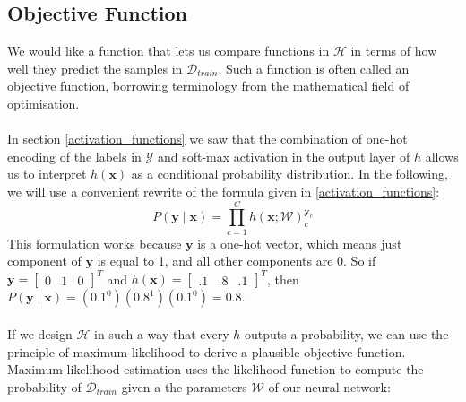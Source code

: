 \subsection{Objective Function}
We would like a function that lets us compare functions in $\mathcal{H}$ in terms of how well they predict the samples in $\mathcal{D}_{train}$. Such a function is often called an objective function, borrowing terminology from the mathematical field of optimisation.
\\\\
In section \ref{activation_functions} we saw that the combination of one-hot encoding of the labels in $\mathcal{Y}$ and soft-max activation in the output layer of $h$ allows us to interpret $h(\mathbf{x})$ as a conditional probability distribution. In the following, we will use a convenient rewrite of the formula given in \ref{activation_functions}:
$$
P(\mathbf{y} \mid \mathbf{x}) = \prod\limits_{c=1}^C h(\mathbf{x};\mathcal{W})^{\mathbf{y}_c}_c
$$
This formulation works because $\mathbf{y}$ is a one-hot vector, which means just component of $\mathbf{y}$ is equal to 1, and all other components are 0. So if $\mathbf{y} = \begin{bmatrix}0 & 1 & 0 \end{bmatrix}^T$ and $h(\mathbf{x}) = \begin{bmatrix}.1 & .8 & .1 \end{bmatrix}^T$, then $P(\mathbf{y} \mid \mathbf{x}) = (0.1^0)(0.8^1)(0.1^0) = 0.8$.
\\\\
If we design $\mathcal{H}$ in such a way that every $h$ outputs a probability, we can use the principle of maximum likelihood to derive a plausible objective function. Maximum likelihood estimation uses the likelihood function to compute the probability of $\mathcal{D}_{train}$ given a the parameters $\mathcal{W}$ of our neural network:

